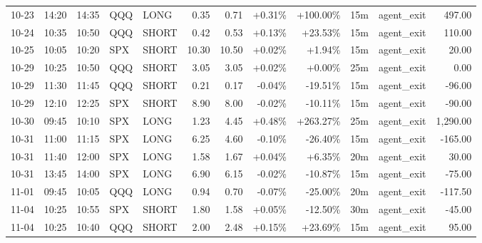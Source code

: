 \documentclass[11pt,a4paper]{article}
\begin{document}
\begin{center}
\begin{longtable}{>{\color{txtmain}}l l l l l r r r r r >{\color{txtmain}}l r}
10-23 & 14:20 & 14:35 & QQQ & LONG & 0.35 & 0.71 & \textcolor{wingreen}{+0.31\%} & \textcolor{wingreen}{+100.00\%} & 15m & agent\_exit & \textcolor{wingreen}{497.00} \\
10-24 & 10:35 & 10:50 & QQQ & SHORT & 0.42 & 0.53 & \textcolor{wingreen}{+0.13\%} & \textcolor{wingreen}{+23.53\%} & 15m & agent\_exit & \textcolor{wingreen}{110.00} \\
10-25 & 10:05 & 10:20 & SPX & SHORT & 10.30 & 10.50 & \textcolor{wingreen}{+0.02\%} & \textcolor{wingreen}{+1.94\%} & 15m & agent\_exit & \textcolor{wingreen}{20.00} \\
10-29 & 10:25 & 10:50 & QQQ & SHORT & 3.05 & 3.05 & \textcolor{wingreen}{+0.02\%} & \textcolor{wingreen}{+0.00\%} & 25m & agent\_exit & \textcolor{wingreen}{0.00} \\
10-29 & 11:30 & 11:45 & QQQ & SHORT & 0.21 & 0.17 & \textcolor{lossred}{-0.04\%} & \textcolor{lossred}{-19.51\%} & 15m & agent\_exit & \textcolor{lossred}{-96.00} \\
10-29 & 12:10 & 12:25 & SPX & SHORT & 8.90 & 8.00 & \textcolor{lossred}{-0.02\%} & \textcolor{lossred}{-10.11\%} & 15m & agent\_exit & \textcolor{lossred}{-90.00} \\
10-30 & 09:45 & 10:10 & SPX & LONG & 1.23 & 4.45 & \textcolor{wingreen}{+0.48\%} & \textcolor{wingreen}{+263.27\%} & 25m & agent\_exit & \textcolor{wingreen}{1,290.00} \\
10-31 & 11:00 & 11:15 & SPX & LONG & 6.25 & 4.60 & \textcolor{lossred}{-0.10\%} & \textcolor{lossred}{-26.40\%} & 15m & agent\_exit & \textcolor{lossred}{-165.00} \\
10-31 & 11:40 & 12:00 & SPX & LONG & 1.58 & 1.67 & \textcolor{wingreen}{+0.04\%} & \textcolor{wingreen}{+6.35\%} & 20m & agent\_exit & \textcolor{wingreen}{30.00} \\
10-31 & 13:45 & 14:00 & SPX & LONG & 6.90 & 6.15 & \textcolor{lossred}{-0.02\%} & \textcolor{lossred}{-10.87\%} & 15m & agent\_exit & \textcolor{lossred}{-75.00} \\
11-01 & 09:45 & 10:05 & QQQ & LONG & 0.94 & 0.70 & \textcolor{lossred}{-0.07\%} & \textcolor{lossred}{-25.00\%} & 20m & agent\_exit & \textcolor{lossred}{-117.50} \\
11-04 & 10:25 & 10:55 & SPX & SHORT & 1.80 & 1.58 & \textcolor{wingreen}{+0.05\%} & \textcolor{lossred}{-12.50\%} & 30m & agent\_exit & \textcolor{lossred}{-45.00} \\
11-04 & 10:25 & 10:40 & QQQ & SHORT & 2.00 & 2.48 & \textcolor{wingreen}{+0.15\%} & \textcolor{wingreen}{+23.69\%} & 15m & agent\_exit & \textcolor{wingreen}{95.00} \\

\end{longtable}
\end{center}
\end{document}
